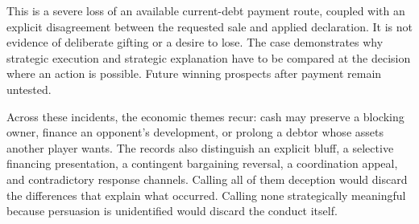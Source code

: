 This is a severe loss of an available current-debt payment route, coupled with an explicit disagreement between the requested sale and applied declaration. It is not evidence of deliberate gifting or a desire to lose. The case demonstrates why strategic execution and strategic explanation have to be compared at the decision where an action is possible. Future winning prospects after payment remain untested.


Across these incidents, the economic themes recur: cash may preserve a blocking owner, finance an opponent's development, or prolong a debtor whose assets another player wants. The records also distinguish an explicit bluff, a selective financing presentation, a contingent bargaining reversal, a coordination appeal, and contradictory response channels. Calling all of them deception would discard the differences that explain what occurred. Calling none strategically meaningful because persuasion is unidentified would discard the conduct itself.
